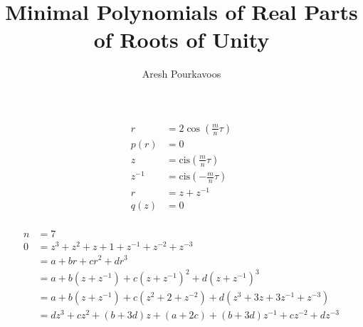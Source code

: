 \documentclass{article}
\begin{document}
\title{Minimal Polynomials of Real Parts of Roots of Unity}
\author{Aresh Pourkavoos}
\maketitle

\newcommand{\cis}{\text{cis}}

\begin{align*}
  r &= 2\cos\left(\frac{m}{n}\tau\right) \\
  p(r) &= 0 \\ 
  z &= \cis\left(\frac{m}{n}\tau\right) \\
  z^{-1} &= \cis\left(-\frac{m}{n}\tau\right) \\
  r &= z+z^{-1} \\
  q(z) &= 0 \\
\end{align*}

\begin{align*}
  n &= 7 \\
  0 &= z^3+z^2+z+1+z^{-1}+z^{-2}+z^{-3} \\
  &= a+br+cr^2+dr^3 \\
  &= a+b(z+z^{-1})+c(z+z^{-1})^2+d(z+z^{-1})^3 \\
  &= a+b(z+z^{-1})+c(z^2+2+z^{-2})+d(z^3+3z+3z^{-1}+z^{-3}) \\
  &= dz^3+cz^2+(b+3d)z+(a+2c)+(b+3d)z^{-1}+cz^{-2}+dz^{-3}
\end{align*}
\end{document}
